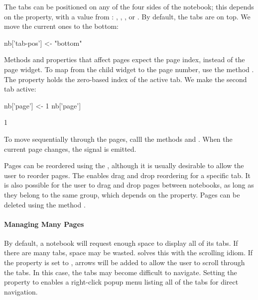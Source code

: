 The tabs can be positioned on any of the four sides of the notebook;
this depends on the  property, with a value from
: , , , or
. By default, the tabs are on top. We move the current ones to the
bottom:
\begin{Schunk}
\begin{Sinput}
 nb['tab-pos'] <- "bottom"
\end{Sinput}
\end{Schunk}

Methods and properties that affect pages expect the page index,
instead of the page widget. To map from the child widget to the page
number, use the method .  The
 property holds the zero-based index of the active
tab. We make the second tab active:
\begin{Schunk}
\begin{Sinput}
 nb['page'] <- 1
 nb['page']
\end{Sinput}
\begin{Soutput}
[1] 1
\end{Soutput}
\end{Schunk}
%
To move sequentially through the pages, calll the methods
 and
. When the current page changes, the
 signal is emitted.

Pages can be reordered using the ,
although it is usually desirable to allow the user to reorder
pages. The  enables drag and
drop reordering for a specific tab. It is also possible for the user
to drag and drop pages between notebooks, as long as they belong to
the same group, which depends on the 
property. Pages can be deleted using the method
.

\paragraph{Managing Many Pages}

By default, a notebook will request enough space to display all of its
tabs. If there are many tabs, space may be wasted. 
solves this with the scrolling idiom. If the
property  is set to , arrows will be added
to allow the user to scroll through the tabs. In this case, the tabs
may become difficult to navigate. Setting the 
property to  enables a right-click popup menu listing all
of the tabs for direct navigation.


